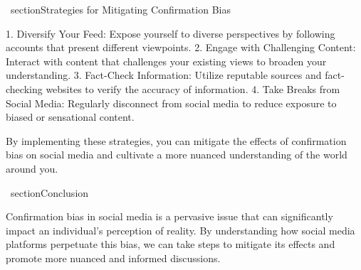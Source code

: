 \ section{Strategies for Mitigating Confirmation Bias}

1.  Diversify Your Feed: Expose yourself to diverse perspectives by following accounts that present different viewpoints.
2.  Engage with Challenging Content: Interact with content that challenges your existing views to broaden your understanding.
3.  Fact-Check Information: Utilize reputable sources and fact-checking websites to verify the accuracy of information.
4.  Take Breaks from Social Media: Regularly disconnect from social media to reduce exposure to biased or sensational content.

By implementing these strategies, you can mitigate the effects of confirmation bias on social media and cultivate a more nuanced understanding of the world around you.

\ section{Conclusion}

Confirmation bias in social media is a pervasive issue that can significantly impact an individual's perception of reality. By understanding how social media platforms perpetuate this bias, we can take steps to mitigate its effects and promote more nuanced and informed discussions.